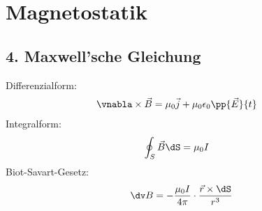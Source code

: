 \documentclass[twocolumn]{summery_3.1}
\begin{document}
\section{Magnetostatik}
\subsection{4. Maxwell'sche Gleichung}
Differenzialform:
\begin{align*}
    \vnabla \times \vec B &= \mu_0 \vec j+ \mu_0\epsilon_0 \pp{\vec E }{t}
\end{align*}
Integralform:
\begin{align*}
    \oint_S \vec B \dS &= \mu_0 I
\end{align*}
Biot-Savart-Gesetz:
\begin{align*}
    \dv B = - \frac{\mu_0 I}{4\pi} \cdot \frac{\vec r \times \dS}{r^3}
\end{align*}

 
\end{document}
